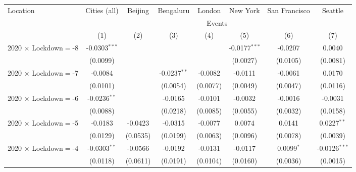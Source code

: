 
\begin{tabular}{lccccccc}
   \toprule
   Location & Cities (all) & Beijing & Bengaluru & London & New York & San Francisco & Seattle \\ \cmidrule(lr){2-2} \cmidrule(lr){3-3} \cmidrule(lr){4-4} \cmidrule(lr){5-5} \cmidrule(lr){6-6} \cmidrule(lr){7-7} \cmidrule(lr){8-8}
    & \multicolumn{7}{c}{Events}\\
                                                & (1)             & (2)           & (3)            & (4)                   & (5)             & (6)            & (7)\\
   \midrule 
   2020 $\times$ Lockdown$=$-8                 & -0.0303$^{***}$ &               &                &                       & -0.0177$^{***}$ & -0.0207        & 0.0040\\
                                                & (0.0099)        &               &                &                       & (0.0027)        & (0.0105)       & (0.0081)\\
   2020 $\times$ Lockdown$=$-7                 & -0.0084         &               & -0.0237$^{**}$ & -0.0082               & -0.0111         & -0.0061        & 0.0170\\
                                                & (0.0101)        &               & (0.0054)       & (0.0077)              & (0.0049)        & (0.0047)       & (0.0116)\\
   2020 $\times$ Lockdown$=$-6                 & -0.0236$^{**}$  &               & -0.0165        & -0.0101               & -0.0032         & -0.0016        & -0.0031\\
                                                & (0.0088)        &               & (0.0218)       & (0.0085)              & (0.0055)        & (0.0032)       & (0.0158)\\
   2020 $\times$ Lockdown$=$-5                 & -0.0183         & -0.0423       & -0.0315        & -0.0077               & 0.0074          & 0.0141         & 0.0227$^{**}$\\
                                                & (0.0129)        & (0.0535)      & (0.0199)       & (0.0063)              & (0.0096)        & (0.0078)       & (0.0039)\\
   2020 $\times$ Lockdown$=$-4                 & -0.0303$^{**}$  & -0.0566       & -0.0192        & -0.0131               & -0.0117         & 0.0099$^{*}$   & -0.0126$^{***}$\\
                                                & (0.0118)        & (0.0611)      & (0.0191)       & (0.0104)              & (0.0160)        & (0.0036)       & (0.0015)\\

\end{tabular}
